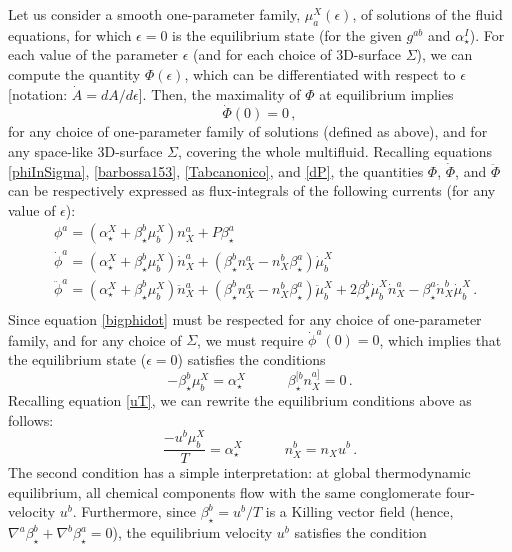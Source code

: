 \documentclass[a4paper, amsfonts, amssymb, amsmath, reprint, showkeys, nofootinbib, twoside, onecolumn,notitlepage]{revtex4-1}
\newcommand{\spc}{\quad \quad \quad}
\theoremstyle{definition}
\theoremstyle{theorem}
\begin{document}
Let us consider a smooth one-parameter family, $ \mu^X_a(\epsilon)$, of solutions of the fluid equations, for which $\epsilon=0$ is the equilibrium state (for the given $g^{ab}$ and $\alpha_\star^I$). For each value of the parameter $\epsilon$ (and for each choice of 3D-surface $\Sigma$), we can compute the quantity $\Phi(\epsilon)$, which can be differentiated with respect to $\epsilon$ [notation: $\dot{A}=dA/d\epsilon$]. Then, the maximality of $\Phi$ at equilibrium implies 
\begin{equation}\label{bigphidot}
\dot{\Phi}(0)=0   \, ,
\end{equation} 
for any choice of one-parameter family of solutions (defined as above), and for any space-like 3D-surface $\Sigma$, covering the whole multifluid. Recalling equations \eqref{phiInSigma}, \eqref{barbossa153}, \eqref{Tabcanonico}, and \eqref{dP}, the quantities $\Phi$, $\dot{\Phi}$, and $\ddot{\Phi}$ can be respectively expressed as flux-integrals of the following currents (for any value of $\epsilon$):
\begin{equation}\label{letrederivate}
\begin{split}
& \phi^a = (\alpha^X_\star + \beta^b_\star \mu^X_b) n_X^a + P  \beta^a_\star   \\
& \dot{\phi}^a = (\alpha^X_\star + \beta^b_\star \mu^X_b) \dot{n}_X^a + (\beta^b_\star  n_X^a -n_X^b   \beta^a_\star) \dot{\mu}^X_b \\
& \ddot{\phi}^a = (\alpha^X_\star + \beta^b_\star \mu^X_b) \ddot{n}_X^a + (\beta^b_\star  n_X^a -n_X^b   \beta^a_\star) \ddot{\mu}^X_b +2\beta^b_\star \dot{\mu}^X_b \dot{n}_X^a -  \beta^a_\star \dot{n}_X^b  \dot{\mu}^X_b \, .  \\
\end{split}
\end{equation}
Since equation \eqref{bigphidot} must be respected for any choice of one-parameter family, and for any choice of $\Sigma$, we must require $\dot{\phi}^a(0) =0$, which implies that the equilibrium state ($\epsilon=0$) satisfies the conditions
\begin{equation}\label{eofmklmbgokf}
  -\beta^b_\star \mu^X_b = \alpha^X_\star  \spc \beta^{[b}_\star  n_X^{a]}=0 \, .
\end{equation}
Recalling equation \eqref{uT}, we can rewrite the equilibrium conditions above as follows:
\begin{equation}\label{ubmub}
\dfrac{-u^b \mu^X_b}{T} =  \alpha^X_\star \spc n_X^b = n_X u^b \, .
\end{equation}
The second condition has a simple interpretation: at global thermodynamic equilibrium, all chemical components flow with the same conglomerate four-velocity $u^b$. Furthermore,  since $\beta_\star^b=u^b/T$ is a Killing vector field (hence, $\nabla^a \beta_{\star}^b+\nabla^b \beta_{\star}^a=0$), the equilibrium velocity $u^b$ satisfies the condition
\end{document}
